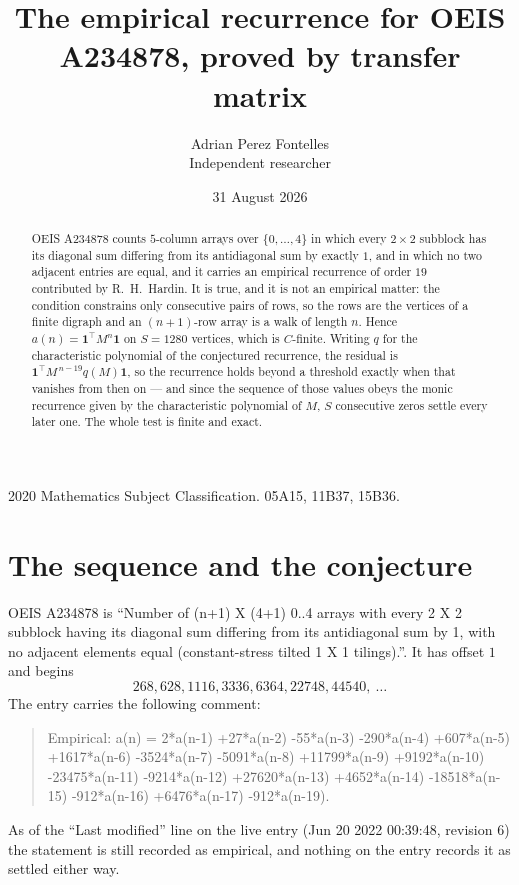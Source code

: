 \documentclass[11pt,a4paper]{article}
\title{The empirical recurrence for OEIS A234878, proved by transfer matrix}
\author{Adrian Perez Fontelles\\ \small Independent researcher}
\date{31 August 2026}
\theoremstyle{plain}
\theoremstyle{definition}
\begin{document}
\maketitle

\begin{abstract}
OEIS A234878 counts $5$-column arrays over $\{0,\dots,4\}$ in which every
$2\times2$ subblock has its diagonal sum differing from its antidiagonal sum by
exactly $1$, and in which no two adjacent entries are equal, and it
carries an empirical recurrence of order $19$ contributed by R.~H.~Hardin. It is true,
and it is not an empirical matter: the condition constrains only consecutive pairs of rows,
so the rows are the vertices of a finite digraph and an $(n+1)$-row array is a walk of
length $n$. Hence $a(n)=\mathbf{1}^{\!\top}M^{n}\mathbf{1}$ on $S=1280$ vertices, which
is $C$-finite. Writing $q$ for the characteristic polynomial of the conjectured recurrence,
the residual is $\mathbf{1}^{\!\top}M^{\,n-19}q(M)\mathbf{1}$, so the recurrence
holds beyond a threshold exactly when that vanishes from then on --- and since the sequence
of those values obeys the monic recurrence given by the characteristic polynomial of $M$,
$S$ consecutive zeros settle every later one. The whole test is finite and exact.
\end{abstract}

\noindent\small 2020 Mathematics Subject Classification. 05A15, 11B37, 15B36.\normalsize

\section{The sequence and the conjecture}

OEIS A234878 is ``Number of (n+1) X (4+1) 0..4 arrays with every 2 X 2 subblock having its diagonal sum differing from its antidiagonal sum by 1, with no adjacent elements equal (constant-stress tilted 1 X 1 tilings).''. It has offset
$1$ and begins
\[
268, 628, 1116, 3336, 6364, 22748, 44540,\ \dots
\]
The entry carries the following comment:
\begin{quote}\small
Empirical: a(n) = 2*a(n-1) +27*a(n-2) -55*a(n-3) -290*a(n-4) +607*a(n-5) +1617*a(n-6) -3524*a(n-7) -5091*a(n-8) +11799*a(n-9) +9192*a(n-10) -23475*a(n-11) -9214*a(n-12) +27620*a(n-13) +4652*a(n-14) -18518*a(n-15) -912*a(n-16) +6476*a(n-17) -912*a(n-19).
\end{quote}
As of the ``Last modified'' line on the live entry (Jun 20 2022 00:39:48, revision 6) the statement is
still recorded as empirical, and nothing on the entry records it as settled either way.
\end{document}

